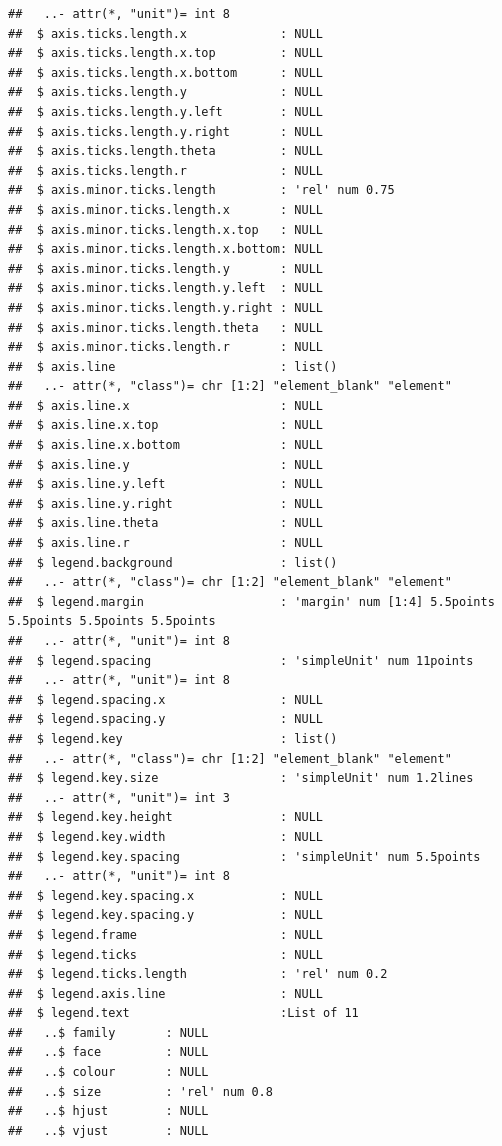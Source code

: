 \documentclass[
  12pt,
]{article}
\begin{document}
\begin{verbatim}
##   ..- attr(*, "unit")= int 8
##  $ axis.ticks.length.x             : NULL
##  $ axis.ticks.length.x.top         : NULL
##  $ axis.ticks.length.x.bottom      : NULL
##  $ axis.ticks.length.y             : NULL
##  $ axis.ticks.length.y.left        : NULL
##  $ axis.ticks.length.y.right       : NULL
##  $ axis.ticks.length.theta         : NULL
##  $ axis.ticks.length.r             : NULL
##  $ axis.minor.ticks.length         : 'rel' num 0.75
##  $ axis.minor.ticks.length.x       : NULL
##  $ axis.minor.ticks.length.x.top   : NULL
##  $ axis.minor.ticks.length.x.bottom: NULL
##  $ axis.minor.ticks.length.y       : NULL
##  $ axis.minor.ticks.length.y.left  : NULL
##  $ axis.minor.ticks.length.y.right : NULL
##  $ axis.minor.ticks.length.theta   : NULL
##  $ axis.minor.ticks.length.r       : NULL
##  $ axis.line                       : list()
##   ..- attr(*, "class")= chr [1:2] "element_blank" "element"
##  $ axis.line.x                     : NULL
##  $ axis.line.x.top                 : NULL
##  $ axis.line.x.bottom              : NULL
##  $ axis.line.y                     : NULL
##  $ axis.line.y.left                : NULL
##  $ axis.line.y.right               : NULL
##  $ axis.line.theta                 : NULL
##  $ axis.line.r                     : NULL
##  $ legend.background               : list()
##   ..- attr(*, "class")= chr [1:2] "element_blank" "element"
##  $ legend.margin                   : 'margin' num [1:4] 5.5points 5.5points 5.5points 5.5points
##   ..- attr(*, "unit")= int 8
##  $ legend.spacing                  : 'simpleUnit' num 11points
##   ..- attr(*, "unit")= int 8
##  $ legend.spacing.x                : NULL
##  $ legend.spacing.y                : NULL
##  $ legend.key                      : list()
##   ..- attr(*, "class")= chr [1:2] "element_blank" "element"
##  $ legend.key.size                 : 'simpleUnit' num 1.2lines
##   ..- attr(*, "unit")= int 3
##  $ legend.key.height               : NULL
##  $ legend.key.width                : NULL
##  $ legend.key.spacing              : 'simpleUnit' num 5.5points
##   ..- attr(*, "unit")= int 8
##  $ legend.key.spacing.x            : NULL
##  $ legend.key.spacing.y            : NULL
##  $ legend.frame                    : NULL
##  $ legend.ticks                    : NULL
##  $ legend.ticks.length             : 'rel' num 0.2
##  $ legend.axis.line                : NULL
##  $ legend.text                     :List of 11
##   ..$ family       : NULL
##   ..$ face         : NULL
##   ..$ colour       : NULL
##   ..$ size         : 'rel' num 0.8
##   ..$ hjust        : NULL
##   ..$ vjust        : NULL

\end{verbatim}
\end{document}
